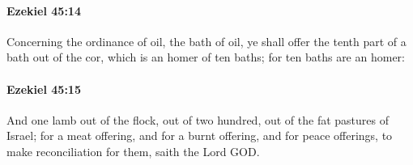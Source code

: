 		\paragraph{Ezekiel 45:14} %
			\label{EZEKIEL-45-14}

			Concerning the ordinance of oil, the bath of oil, ye shall offer the tenth part of a bath out of the cor, which is an homer of ten baths; for ten baths are an homer:


		\paragraph{Ezekiel 45:15} %
			\label{EZEKIEL-45-15}

			And one lamb out of the flock, out of two hundred, out of the fat pastures of Israel; for a meat offering, and for a burnt offering, and for peace offerings, to make reconciliation for them, saith the Lord GOD.

